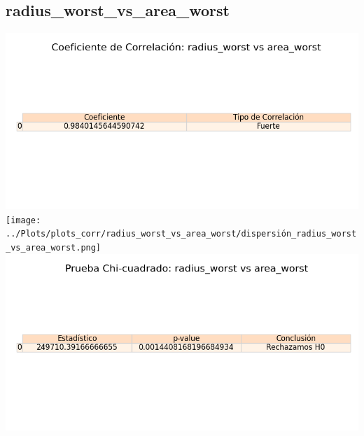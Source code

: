 \documentclass[a4paper, 12pt]{article}
\begin{document}
\subsection{radius\_worst\_vs\_area\_worst}
    \includegraphics[width = \textwidth]{../Plots/plots_corr/radius_worst_vs_area_worst/coeficiente_correlacion_radius_worst_vs_area_worst.png}
    \texttt{[image: ../Plots/plots\_corr/radius\_worst\_vs\_area\_worst/dispersión\_radius\_worst\_vs\_area\_worst.png]}
    \includegraphics[width = \textwidth]{../Plots/plots_corr/radius_worst_vs_area_worst/chi_cuadrado_radius_worst_vs_area_worst.png}
\end{document}
